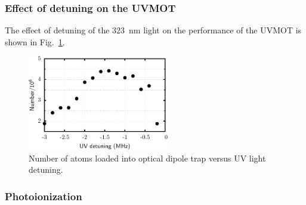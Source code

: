 \documentclass[oneside,12pt]{memoir}
\begin{document}
\subsubsection{Effect of detuning on the UVMOT}

The effect of detuning of the 323~nm light on the performance of the UVMOT is
shown in Fig.~\ref{fig:uvdet}.   
\begin{figure}
\centering
\includegraphics[width=0.55\textwidth]{../figures/323mot/uvdet/uvdeteps.pdf}
\caption[UVMOT performance vs. detuning]{\small Number of atoms loaded into
optical dipole trap versus UV light detuning. }
\label{fig:uvdet} \end{figure} 


\subsubsection{Photoionization}
\end{document}
